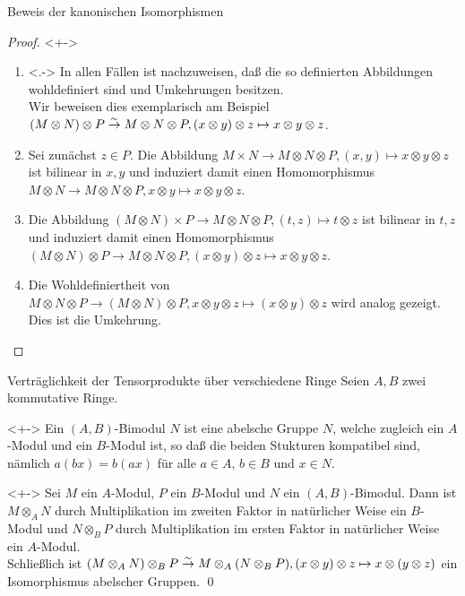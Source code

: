\begin{frame}{Beweis der kanonischen Isomorphismen}
	\begin{proof}<+->
		\begin{enumerate}[<+->]
		\item<.->
			In allen Fällen ist nachzuweisen, daß die so definierten Abbildungen wohldefiniert sind und 
			Umkehrungen	besitzen.
			\\
			Wir beweisen dies exemplarisch am Beispiel \((M \otimes N) \otimes P
			\stackrel\sim\to M \otimes N \otimes P, (x \otimes y) \otimes z \mapsto x \otimes y \otimes z\).
		\item
			Sei zunächst \(z \in P\). Die Abbildung \(M \times N \to M \otimes N \otimes P, (x, y) \mapsto x \otimes y
			\otimes z\) ist bilinear in \(x, y\) und induziert damit einen Homomorphismus
			\(M \otimes N \to M \otimes N \otimes P, x \otimes y \mapsto x \otimes
			y \otimes z\).
		\item
			Die Abbildung \((M \otimes N) \times P \to M \otimes N \otimes P, (t, z) \mapsto t \otimes z\)
			ist bilinear in \(t, z\) und induziert damit einen Homomorphismus \((M \otimes N) \otimes P
			\to M \otimes N \otimes P, (x \otimes y) \otimes z \mapsto x \otimes y \otimes z\).
		\item
			Die Wohldefiniertheit von
			\(M \otimes N \otimes P \to (M \otimes N) \otimes P, x \otimes y \otimes z \mapsto
			(x \otimes y) \otimes z\) wird analog gezeigt. Dies ist die Umkehrung.
			\qedhere
		\end{enumerate}
	\end{proof}
\end{frame}

\begin{frame}{Verträglichkeit der Tensorprodukte über verschiedene Ringe}
	Seien \(A, B\) zwei kommutative Ringe.
	\begin{definition}<+->
		Ein \((A, B)\)-Bimodul \(N\) ist eine abelsche Gruppe \(N\), welche zugleich ein \(A\)-Modul
		und ein \(B\)-Modul ist, so daß die beiden Stukturen kompatibel sind, nämlich
		\(a (b x) = b (a x)\) für alle \(a \in A\), \(b \in B\) und \(x \in N\).
	\end{definition}
	\begin{proposition}<+->
		Sei \(M\) ein \(A\)-Modul, \(P\) ein \(B\)-Modul und \(N\) ein \((A, B)\)-Bimodul. Dann ist
		\(M \otimes_A N\) durch Multiplikation im zweiten Faktor in natürlicher Weise ein \(B\)-Modul und
		\(N \otimes_B P\) durch Multiplikation im ersten Faktor in natürlicher Weise ein \(A\)-Modul.
		\\
		Schließlich ist \((M \otimes_A N) \otimes_B P \stackrel\sim\to M \otimes_A (N \otimes_B P),
		(x \otimes y) \otimes z \mapsto x \otimes (y \otimes z)\) ein Isomorphismus abelscher Gruppen.
		\qed
	\end{proposition}
\end{frame}

